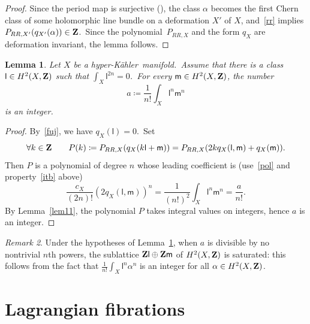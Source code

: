 \documentclass[12pt]{amsart}
\def\Z{{\bf Z}}
\def\hk{hyper-K\"ahler}
\newtheorem{lemm}{Lemma}[section]
\theoremstyle{remark}
\newtheorem{rema}[lemm]{Remark}
\def\lll{\ensuremath{\mathsf l}}
\def\mm{\ensuremath{\mathsf m}}
\begin{document}
\begin{proof}
Since the period map is surjective (\cite[Proposition~25.12]{huy}), the class $\alpha$ becomes the first Chern class of some holomorphic line bundle on a deformation $X'$ of $X$, and~\eqref{rr} implies $P_{RR,X'}(q_{X'}(\alpha))\in \Z$.\ Since the polynomial~$P_{RR,X} $ and the form $q_X$ are deformation invariant, the lemma follows.
\end{proof}

\begin{lemm}\label{lemmaa}
Let $X$ be a \hk\ manifold.\ Assume   that there is a  class~$\lll \in H^2(X,\Z)$ such that $\int_X \lll^{2n}=0$.\ For every $ \mm\in H^2(X,\Z)$, the number
\begin{equation}\label{defa2}
a\coloneqq \frac{1}{n!}\int_X \lll^{n}\mm^{n}
\end{equation}
is  an integer.
\end{lemm}

\begin{proof}
By~\eqref{fuj}, we have $q_X(\lll)=0$.\ Set
\begin{equation}\label{defP}
\forall k\in \Z\qquad P(k)\coloneqq P_{RR,X}(q_X(k\lll+ \mm))=P_{RR,X}(2kq_X(\lll,\mm)+q_X(\mm)) .
\end{equation}
Then $P$ is a  polynomial of degree $n$ whose leading coefficient is  (use~\eqref{pol} and property~\ref{itb} above)
\begin{equation}\label{defia}
\frac{c_X}{(2n)!} (2 q_X(\lll,\mm))^n=\frac{1}{(n!)^2}\int_X \lll^{n}\mm^{n}=\frac{a}{n!}.
\end{equation}
By Lemma~\ref{lem11}, the polynomial $P$ takes integral values on integers, hence $a$ is  an integer.
\end{proof}


\begin{rema}\label{prim}
Under the hypotheses of Lemma~\ref{lemmaa}, when $a$ is    divisible by no nontrivial $n$th powers, the sublattice $\Z\lll\oplus \Z\mm$ of $H^2(X,\Z)$ is saturated: this follows from the fact that  $\frac{1}{n!}\int_X \lll^{n}\alpha^{n}$ is an integer for all $\alpha\in H^2(X,\Z)$.
\end{rema}





\section{Lagrangian fibrations}\label{sec:LagrangianFibration}
\end{document}
